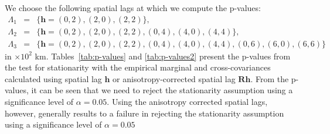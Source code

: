 \documentclass[12pt]{article}
\newcommand{\0}{\mathbf{0}}
\begin{document}
We choose the following spatial lags at which we compute the p-values: 
\begin{eqnarray*}
\Lambda_1 & = & \{ \mathbf{h} = (0, 2), (2, 0), (2, 2)\}, \\
\Lambda_2 & = & \{ \mathbf{h} = (0, 2), (2, 0), (2, 2), (0, 4), (4, 0), (4, 4)\}, \\
\Lambda_3 & = & \{ \mathbf{h} = (0, 2), (2, 0), (2, 2), (0, 4), (4, 0), (4, 4), (0, 6), (6, 0), (6, 6) \}
\end{eqnarray*}
in $\times 10^2$ km. Tables~\ref{tab:p-values} and \ref{tab:p-values2} present the p-values from the test for stationarity with the empirical marginal and cross-covariances calculated using spatial lag $\mathbf{h}$ or anisotropy-corrected spatial lag $\mathbf{Rh}$. From the p-values, it can be seen that we need to reject the stationarity assumption using a significance level of $\alpha = 0.05$. Using the anisotropy corrected spatial lags, however, generally results to a failure in rejecting the stationarity assumption using a significance level of $\alpha = 0.05$

\begin{table*}[h] %
\centering
{}
  \label{tab:p-values}
\end{table*}
\end{document}
